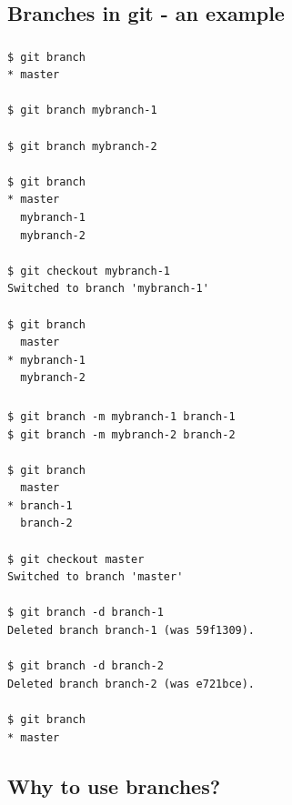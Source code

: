 \subsection{Branches in git - an example}
\begin{frame}[fragile]
  \frametitle{\insertsubsection}

  \begin{small}
\begin{verbatim}
$ git branch
* master

$ git branch mybranch-1

$ git branch mybranch-2

$ git branch
* master
  mybranch-1
  mybranch-2

$ git checkout mybranch-1
Switched to branch 'mybranch-1'

$ git branch
  master
* mybranch-1
  mybranch-2
\end{verbatim}
  \end{small}

\end{frame}
\begin{frame}[fragile]
  \frametitle{\insertsubsection}

  \begin{small}
\begin{verbatim}
$ git branch -m mybranch-1 branch-1
$ git branch -m mybranch-2 branch-2

$ git branch
  master
* branch-1
  branch-2

$ git checkout master
Switched to branch 'master'

$ git branch -d branch-1
Deleted branch branch-1 (was 59f1309).

$ git branch -d branch-2
Deleted branch branch-2 (was e721bce).

$ git branch
* master
\end{verbatim}
  \end{small}

\end{frame}


\subsection{Why to use branches?}

